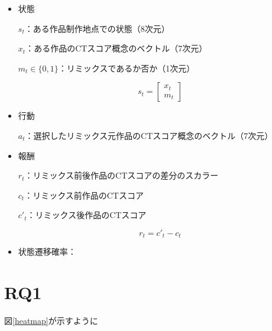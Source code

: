 \documentclass[submit,techrep,noauthor]{ipsj}
\begin{document}
\begin{itemize}
  \item 状態
    
    $s_t$：ある作品制作地点での状態（8次元）

    $x_t$：ある作品のCTスコア概念のベクトル（7次元）

    $m_t\in\{0,1\}$：リミックスであるか否か（1次元）

    \begin{equation}
        s_t = 
        \begin{bmatrix}
           x_t \\
           m_t 
        \end{bmatrix}
    \end{equation}

  \item 行動

    $a_t$：選択したリミックス元作品のCTスコア概念のベクトル（7次元）

  
  \item 報酬

    $r_t$：リミックス前後作品のCTスコアの差分のスカラー
    
    $c_t$：リミックス前作品のCTスコア

    $c'_t$：リミックス後作品のCTスコア
    
    \begin{equation}
        r_t = c'_t - c_t
    \end{equation}

    

    
  
  \item 状態遷移確率：
\end{itemize}

\section{RQ1}

図\ref{heatmap}が示すように
\end{document}
